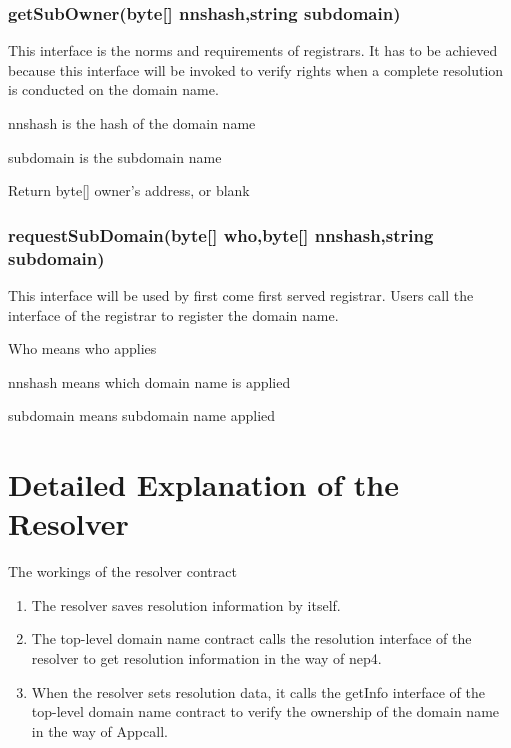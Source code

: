 \documentclass[letterpaper,10pt,english]{sphinxmanual}
\begin{document}
\subsubsection{getSubOwner(byte{[}{]} nnshash,string subdomain)}
\label{\detokenize{nns_protocol:getsubowner-byte-nnshash-string-subdomain}}
This interface is the norms and requirements of registrars.
It has to be achieved because this interface will be invoked to verify rights when a complete resolution is conducted on the domain name.

nnshash is the hash of the domain name

subdomain is the subdomain name

Return byte{[}{]} owner’s address, or blank


\subsubsection{requestSubDomain(byte{[}{]} who,byte{[}{]} nnshash,string subdomain)}
\label{\detokenize{nns_protocol:requestsubdomain-byte-who-byte-nnshash-string-subdomain}}
This interface will be used by first come first served registrar. Users call the interface of the registrar to register the domain name.

Who means who applies

nnshash means which domain name is applied

subdomain means subdomain name applied


\section{Detailed Explanation of the Resolver}
\label{\detokenize{nns_protocol:detailed-explanation-of-the-resolver}}
The workings of the resolver contract
\begin{enumerate}
\item {} 
The resolver saves resolution information by itself.

\item {} 
The top-level domain name contract calls the resolution interface of the resolver to get resolution information in the way of nep4.

\item {} 
When the resolver sets resolution data, it calls the getInfo interface of the top-level domain name contract to verify the ownership of the domain name in the way of Appcall.

\end{enumerate}
\end{document}
